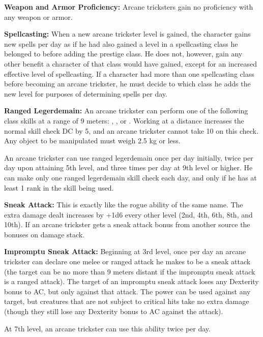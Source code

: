 {
\textbf{Weapon and Armor Proficiency:} Arcane tricksters gain no proficiency with any weapon or armor.

\textbf{Spellcasting:} When a new arcane trickster level is gained, the character gains new spells per day as if he had also gained a level in a spellcasting class he belonged to before adding the prestige class. He does not, however, gain any other benefit a character of that class would have gained, except for an increased effective level of spellcasting. If a character had more than one spellcasting class before becoming an arcane trickster, he must decide to which class he adds the new level for purposes of determining spells per day.

\textbf{Ranged Legerdemain:} An arcane trickster can perform one of the following class skills at a range of 9 meters: , , or . Working at a distance increases the normal skill check DC by 5, and an arcane trickster cannot take 10 on this check. Any object to be manipulated must weigh 2.5 kg or less.

An arcane trickster can use ranged legerdemain once per day initially, twice per day upon attaining 5th level, and three times per day at 9th level or higher. He can make only one ranged legerdemain skill check each day, and only if he has at least 1 rank in the skill being used.

\textbf{Sneak Attack:} This is exactly like the rogue ability of the same name. The extra damage dealt increases by +1d6 every other level (2nd, 4th, 6th, 8th, and 10th). If an arcane trickster gets a sneak attack bonus from another source the bonuses on damage stack.

\textbf{Impromptu Sneak Attack:} Beginning at 3rd level, once per day an arcane trickster can declare one melee or ranged attack he makes to be a sneak attack (the target can be no more than 9 meters distant if the impromptu sneak attack is a ranged attack). The target of an impromptu sneak attack loses any Dexterity bonus to AC, but only against that attack. The power can be used against any target, but creatures that are not subject to critical hits take no extra damage (though they still lose any Dexterity bonus to AC against the attack).

At 7th level, an arcane trickster can use this ability twice per day.
}
